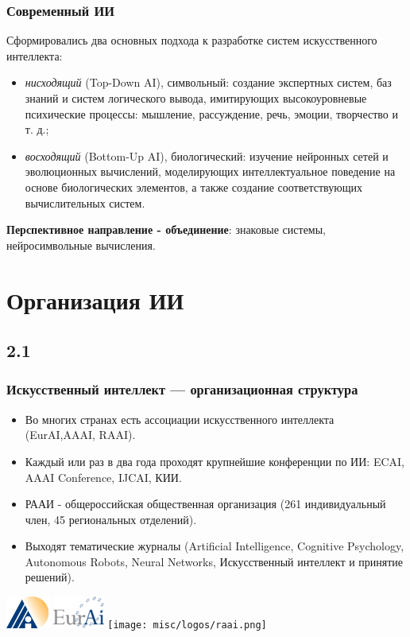 \documentclass[default]{beamer}
\begin{document}
	\begin{frame}
		\frametitle{Современный ИИ}
		Сформировались два основных подхода к разработке систем искусственного интеллекта:
		\begin{itemize}
			\item \textit{нисходящий} (Top-Down AI), символьный: создание экспертных систем, баз знаний и систем логического вывода, имитирующих высокоуровневые психические процессы: мышление, рассуждение, речь, эмоции, творчество и т. д.;
			\item \textit{восходящий} (Bottom-Up AI), биологический: изучение нейронных сетей и эволюционных вычислений, моделирующих интеллектуальное поведение на основе биологических элементов, а также создание соответствующих вычислительных систем.
		\end{itemize}
	
		\textbf{Перспективное направление - объединение}: знаковые системы, нейросимвольные вычисления.
	\end{frame}


	\section{Организация ИИ}
	\subsection{2.1}
	\begin{frame}
		\frametitle{Искусственный интеллект --- организационная структура}
		
		\begin{itemize}
			\item Во многих странах есть ассоциации искусственного интеллекта (EurAI,AAAI, RAAI).
			\item Каждый или раз в два года проходят крупнейшие конференции по ИИ: ECAI, AAAI Conference, IJCAI, КИИ.
			\item РААИ - общероссийская общественная организация (261 индивидуальный член, 45 региональных отделений).
			\item Выходят тематические журналы (Artificial Intelligence, Cognitive Psychology, Autonomous Robots, Neural Networks, Искусственный интеллект и принятие решений).
		\end{itemize}
		\par\bigskip
		\centering
		\includegraphics[height=30pt]{aaai.png} \hspace{10pt}
		\includegraphics[height=30pt]{eurai.png} \hspace{10pt}
		\texttt{[image: misc/logos/raai.png]} 
	\end{frame}
\end{document}
